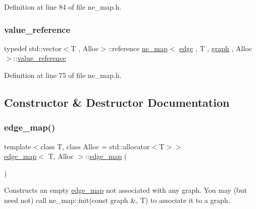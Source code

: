 Definition at line 84 of file ne\+\_\+map.\+h.

\mbox{\label{classne__map_a3de60750d102f8992a215b0fe645014d}} 
\subsubsection{\texorpdfstring{value\+\_\+reference}{value\_reference}}
{\footnotesize\ttfamily typedef std\+::vector$<$T , Alloc$>$\+::reference \mbox{\hyperlink{classne__map}{ne\+\_\+map}}$<$ \mbox{\hyperlink{classedge}{edge}} , T , \mbox{\hyperlink{classgraph}{graph}} , Alloc $>$\+::\mbox{\hyperlink{classne__map_a3de60750d102f8992a215b0fe645014d}{value\+\_\+reference}}\hspace{0.3cm}{\ttfamily [inherited]}}



Definition at line 75 of file ne\+\_\+map.\+h.



\subsection{Constructor \& Destructor Documentation}
\mbox{\label{classedge__map_a947fa280ba03fd11b1813d484572e6df}} 
\subsubsection{\texorpdfstring{edge\+\_\+map()}{edge\_map()}\hspace{0.1cm}{\footnotesize\ttfamily [1/2]}}
{\footnotesize\ttfamily template$<$class T, class Alloc = std\+::allocator$<$\+T$>$$>$ \\
\mbox{\hyperlink{classedge__map}{edge\+\_\+map}}$<$ T, Alloc $>$\+::\mbox{\hyperlink{classedge__map}{edge\+\_\+map}} (\begin{DoxyParamCaption}{ }\end{DoxyParamCaption})\hspace{0.3cm}{\ttfamily [inline]}}

Constructs an empty {\ttfamily \mbox{\hyperlink{classedge__map}{edge\+\_\+map}}} not associated with any {\ttfamily graph}. You may (but need not) call {\ttfamily ne\+\_\+map\+::init(const graph \&, T)} to associate it to a {\ttfamily graph}. 

